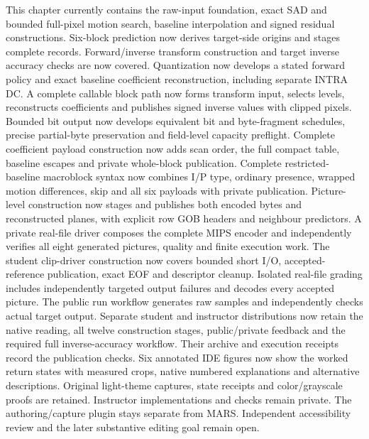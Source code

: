 This chapter currently contains the raw-input foundation, exact SAD and bounded
full-pixel motion search, baseline interpolation and signed residual constructions.
Six-block prediction now derives target-side origins and stages complete records.
Forward/inverse transform construction and target inverse accuracy checks are now
covered. Quantization now develops a stated forward policy and exact baseline
coefficient reconstruction, including separate INTRA DC. A complete callable block
path now forms transform input, selects levels, reconstructs coefficients and
publishes signed inverse values with clipped pixels. Bounded bit output now
develops equivalent bit and byte-fragment schedules, precise partial-byte
preservation and field-level capacity preflight. Complete coefficient payload
construction now adds scan order, the full compact table, baseline escapes and
private whole-block publication. Complete restricted-baseline macroblock syntax
now combines I/P type, ordinary presence, wrapped motion differences, skip and all
six payloads with private publication. Picture-level construction now stages and publishes both encoded bytes and reconstructed
planes, with explicit row GOB headers and neighbour predictors. A private real-file
driver composes the complete MIPS encoder and independently verifies all eight
generated pictures, quality and finite execution work. The student clip-driver construction now covers bounded short I/O, accepted-reference
publication, exact EOF and descriptor cleanup. Isolated real-file grading includes
independently targeted output failures and decodes every accepted picture. The public
run workflow generates raw samples and independently checks actual target output.
Separate student and instructor distributions now retain the native reading, all twelve
construction stages, public/private feedback and the required full inverse-accuracy
workflow. Their archive and execution receipts record the publication checks.
Six annotated IDE figures now show the worked return states with measured crops,
native numbered explanations and alternative descriptions. Original light-theme
captures, state receipts and color/grayscale proofs are retained. Instructor
implementations and checks remain private.
The authoring/capture plugin stays separate from MARS. Independent accessibility
review and the later substantive editing goal remain open.
